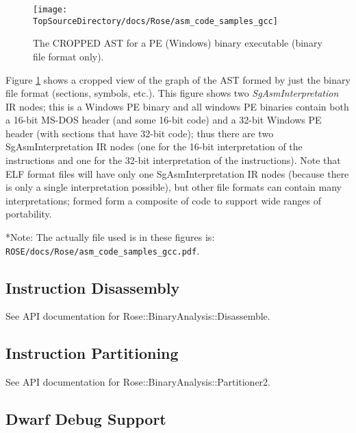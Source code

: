 \begin{figure}
\texttt{[image: \\TopSourceDirectory/docs/Rose/asm\_code\_samples\_gcc]}
\caption{The CROPPED AST for a PE (Windows) binary executable (binary file format only).} 

\label{binaryAnalysis:BinaryExecutableFormatAST_2}
\end{figure}

Figure \ref{binaryAnalysis:BinaryExecutableFormatAST_2} shows a cropped view of the graph
of the AST formed by just the binary file format (sections, symbols, etc.).  This figure
shows two {\em SgAsmInterpretation} IR nodes; this is a Windows PE binary and all windows
PE binaries contain both a 16-bit MS-DOS header (and some 16-bit code) and a 32-bit Windows
PE header (with sections that have 32-bit code); thus there are two SgAsmInterpretation IR
nodes (one for the 16-bit interpretation of the instructions and one for the 32-bit 
interpretation of the instructions).  Note that ELF format files will have only one
SgAsmInterpretation IR nodes (because there is only a single interpretation possible), but
other file formats can contain many interpretations; formed form a composite of code to
support wide ranges of portability.

*Note: The actually file used is in these figures is: {\tt ROSE/docs/Rose/asm\_code\_samples\_gcc.pdf}.

\subsection{Instruction Disassembly}

See API documentation for Rose::BinaryAnalysis::Disassemble.

\subsection{Instruction Partitioning}

See API documentation for Rose::BinaryAnalysis::Partitioner2.

\subsection{Dwarf Debug Support}

